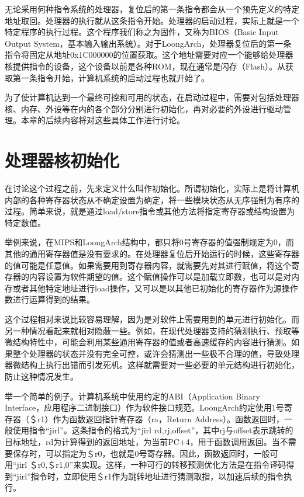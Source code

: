 \documentclass[]{ctexbook}
\begin{document}
无论采用何种指令系统的处理器，复位后的第一条指令都会从一个预先定义的特定地址取回。处理器的执行就从这条指令开始。处理器的启动过程，实际上就是一个特定程序的执行过程。这个程序我们称之为固件，又称为BIOS（Basic Input Output System，基本输入输出系统）。对于LoongArch，处理器复位后的第一条指令将固定从地址0x1C000000的位置获取。这个地址需要对应一个能够给处理器核提供指令的设备，这个设备以前是各种ROM，现在通常是闪存（Flash）。从获取第一条指令开始，计算机系统的启动过程也就开始了。

为了使计算机达到一个最终可控和可用的状态，在启动过程中，需要对包括处理器核、内存、外设等在内的各个部分分别进行初始化，再对必要的外设进行驱动管理。本章的后续内容将对这些具体工作进行讨论。

\hypertarget{ux5904ux7406ux5668ux6838ux521dux59cbux5316}{%
\section{处理器核初始化}\label{ux5904ux7406ux5668ux6838ux521dux59cbux5316}}

在讨论这个过程之前，先来定义什么叫作初始化。所谓初始化，实际上是将计算机内部的各种寄存器状态从不确定设置为确定，将一些模块状态从无序强制为有序的过程。简单来说，就是通过load/store指令或其他方法将指定寄存器或结构设置为特定数值。

举例来说，在MIPS和LoongArch结构中，都只将0号寄存器的值强制规定为0，而其他的通用寄存器值是没有要求的。在处理器复位后开始运行的时候，这些寄存器的值可能是任意值。如果需要用到寄存器内容，就需要先对其进行赋值，将这个寄存器的内容设置为软件期望的值。这个赋值操作可以是加载立即数，也可以是对内存或者其他特定地址进行load操作，又可以是以其他已初始化的寄存器作为源操作数进行运算得到的结果。

这个过程相对来说比较容易理解，因为是对软件上需要用到的单元进行初始化。而另一种情况看起来就相对隐蔽一些。例如，在现代处理器支持的猜测执行、预取等微结构特性中，可能会利用某些通用寄存器的值或者高速缓存的内容进行猜测。如果整个处理器的状态并没有完全可控，或许会猜测出一些极不合理的值，导致处理器微结构上执行出错而引发死机。这样就需要对一些必要的单元结构进行初始化，防止这种情况发生。

举一个简单的例子。计算机系统中使用约定的ABI（Application Binary Interface，应用程序二进制接口）作为软件接口规范。LoongArch约定使用1号寄存器（＄r1）作为函数返回指针寄存器（ra，Return Address）。函数返回时，一般使用指令``jirl''。这条指令的格式为``jirl rd,rj,offset''，其中rj与offset表示跳转的目标地址，rd为计算得到的返回地址，为当前PC+4，用于函数调用返回。当不需要保存时，可以指定为＄r0，也就是0号寄存器。因此，函数返回时，一般可用``jirl ＄r0,＄r1,0''来实现。这样，一种可行的转移预测优化方法是在指令译码得到``jirl''指令时，立即使用＄r1作为跳转地址进行猜测取指，以加速后续的指令执行。
\end{document}
